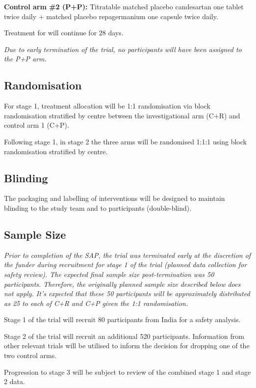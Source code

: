 \documentclass[11pt,parskip=half-]{scrartcl}
\begin{document}
\textbf{Control arm \#2 (P+P):}  Titratable matched placebo candesartan
one tablet twice daily + matched placebo repagermanium one capsule twice daily.

Treatment for will continue for 28 days.

\emph{Due to early termination of the trial, no participants will have been assigned to the P+P arm.}

\subsection{Randomisation}
For stage 1, treatment allocation will be 1:1 randomisation via block randomisation stratified by centre between the investigational arm (C+R) and control arm 1 (C+P).

Following stage 1, in stage 2 the three arms will be randomised 1:1:1 using block randomisation stratified by centre.

\subsection{Blinding}
The packaging and labelling of interventions will be designed to maintain blinding to the study team and to participants (double-blind).

\subsection{Sample Size}

\emph{Prior to completion of the SAP, the trial was terminated early at the discretion of the funder during recruitment for stage 1 of the trial (planned data collection for safety review). The expected final sample size post-termination was 50 participants. Therefore, the originally planned sample size described below does not apply. It's expected that these 50 participants will be approximately distributed as 25 to each of C+R and C+P given the 1:1 randomisation.}

Stage 1 of the trial will recruit 80 participants from India for a safety analysis.

Stage 2 of the trial will recruit an additional 520 participants. Information from other relevant trials will be utilised to inform the decision for dropping one of the two control arms.

Progression to stage 3 will be subject to review of the combined stage 1 and stage 2 data.

\clearpage
\end{document}
